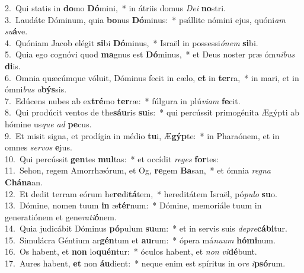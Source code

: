 {2.~}Qui statis in \textbf{do}mo \textbf{Dó}mini,~* in átriis domus \textit{De}\textit{i} \textbf{no}stri.\\
{3.~}Laudáte Dóminum, quia \textbf{bo}nus \textbf{Dó}minus:~* psállite nómini ejus, quóni\textit{am} \textit{su}\textbf{á}ve.\\
{4.~}Quóniam Jacob elégit \textbf{si}bi \textbf{Dó}minus,~* Israël in possessi\textit{ó}\textit{nem} \textbf{si}bi.\\
{5.~}Quia ego cognóvi quod \textbf{ma}gnus est \textbf{Dó}minus,~* et Deus noster præ óm\textit{ni}\textit{bus} \textbf{di}is.\\
{6.~}Omnia quæcúmque vóluit, Dóminus fecit in cælo, \textbf{et} in \textbf{ter}ra,~* in mari, et in ómni\textit{bus} \textit{a}\textbf{býs}sis.\\
{7.~}Edúcens nubes ab ex\textbf{tré}mo \textbf{ter}ræ:~* fúlgura in plú\textit{vi}\textit{am} \textbf{fe}cit.\\
{8.~}Qui prodúcit ventos de the\textbf{sáu}ris \textbf{su}is:~* qui percússit primogénita Ægýpti ab hómine us\textit{que} \textit{ad} \textbf{pe}cus.\\
{9.~}Et misit signa, et prodígia in médio \textbf{tu}i, Æ\textbf{gýp}te:~* in Pharaónem, et in omnes \textit{ser}\textit{vos} \textbf{e}jus.\\
{10.~}Qui percússit \textbf{gen}tes \textbf{mul}tas:~* et occídit \textit{re}\textit{ges} \textbf{for}tes:\\
{11.~}Sehon, regem Amorrhæórum, et Og, \textbf{re}gem \textbf{Ba}san,~* et ómnia \textit{re}\textit{gna} \textbf{Chá}\textbf{na}an.\\
{12.~}Et dedit terram eórum he\textbf{re}di\textbf{tá}tem,~* hereditátem Israël, pó\textit{pu}\textit{lo} \textbf{su}o.\\
{13.~}Dómine, nomen tuum \textbf{in} æ\textbf{tér}num:~* Dómine, memoriále tuum in generatiónem et gene\textit{ra}\textit{ti}\textbf{ó}nem.\\
{14.~}Quia judicábit Dóminus \textbf{pó}pulum \textbf{su}um:~* et in servis suis \textit{de}\textit{pre}\textbf{cá}\textbf{bi}tur.\\
{15.~}Simulácra Géntium ar\textbf{gén}tum et \textbf{au}rum:~* ópera má\textit{nu}\textit{um} \textbf{hó}\textbf{mi}num.\\
{16.~}Os habent, et \textbf{non} lo\textbf{quén}tur:~* óculos habent, et \textit{non} \textit{vi}\textbf{dé}bunt.\\
{17.~}Aures habent, \textbf{et} non \textbf{áu}dient:~* neque enim est spíritus in o\textit{re} \textit{i}\textbf{psó}rum.\\

